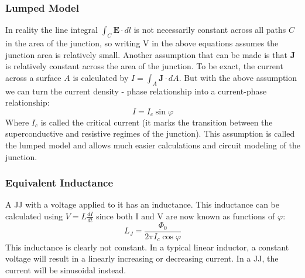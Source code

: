 \documentclass[conf]{new-aiaa}
\begin{document}
\subsubsection{Lumped Model}
In reality the line integral $\int_C \mathbf{E} \cdot dl$ is not necessarily constant across all paths $C$ in the area of the junction, so writing V in the above equations assumes the junction area is relatively small. Another assumption that can be made is that $\mathbf{J}$ is relatively constant across the area of the junction. To be exact, the current across a surface $A$ is calculated by $I = \int_A \mathbf{J} \cdot dA$. But with the above assumption we can turn the current density - phase relationship into a current-phase relationship: 
$$I = I_c \sin \varphi$$
Where $I_c$ is called the critical current (it marks the transition between the superconductive and resistive regimes of the junction). This assumption is called the lumped model and allows much easier calculations and circuit modeling of the junction.

\subsubsection{Equivalent Inductance}
A JJ with a voltage applied to it has an inductance. This inductance can be calculated using $V = L\frac{dI}{dt}$ since both I and V are now known as functions of $\varphi$:
$$L_J = \frac{\Phi_0}{2\pi I_c \cos{\varphi}}$$
This inductance is clearly not constant. In a typical linear inductor, a constant voltage will result in a linearly increasing or decreasing current. In a JJ, the current will be sinusoidal instead.
\end{document}
